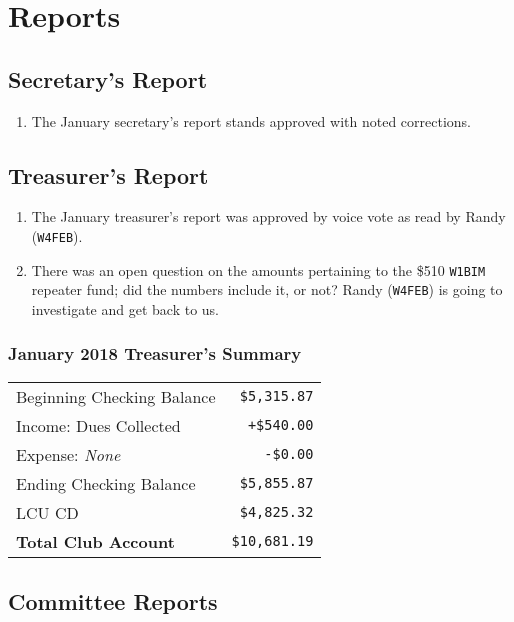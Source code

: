 \documentclass[10pt,letterpaper]{article}
\begin{document}
\section{Reports}

\subsection{Secretary's Report}
\begin{enumerate}
  \item The January secretary's report stands approved with noted corrections.
\end{enumerate}

\newpage
\subsection{Treasurer's Report}
\begin{enumerate}
  \item The January treasurer's report was approved by voice vote as read by Randy (\texttt{W4FEB}).
  \item There was an open question on the amounts pertaining to the \$510 \texttt{W1BIM} repeater fund; did the numbers include it, or not? Randy (\texttt{W4FEB}) is going to investigate and get back to us.
\end{enumerate}

\subsubsection{January 2018 Treasurer's Summary}
\noindent
\begin{tabular}{|l|r|}
  \hline
  Beginning Checking Balance & \texttt{\$5,315.87} \\
  Income: Dues Collected & \texttt{+\$540.00} \\
  Expense: \emph{None} & \texttt{-\$0.00} \\
  Ending Checking Balance & \texttt{\$5,855.87} \\
  \hline
  \hline
  LCU CD & \texttt{\$4,825.32} \\
  \hline
  \hline
  \textbf{Total Club Account} & \texttt{\$10,681.19} \\
  \hline
\end{tabular}

\subsection{Committee Reports}
\end{document}
